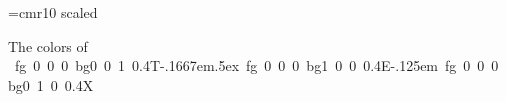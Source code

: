 \font\large=cmr10 scaled 
\large
\def\blue{\HINTcolor
   {fg {0 0 0} bg{0 0 1 0.4}}}
\def\red{\HINTcolor
   {fg {0 0 0} bg{1 0 0 0.4}}}
\def\green{\HINTcolor
   {fg {0 0 0} bg{0 1 0 0.4}}}
\def\TeX{\hbox{\blue T}\kern-.1667em\lower.5ex\hbox{\red E}\kern-.125em\hbox{\green X}}

The colors of \TeX

\bye
